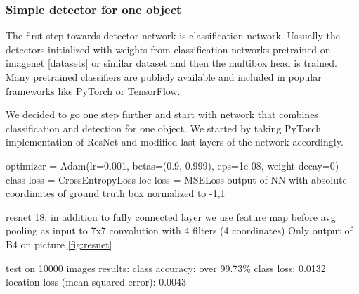 


\subsubsection{Simple detector for one object}
The first step towards detector network is classification network. Ussually the detectors initialized with weights from classification networks pretrained on imagenet \cref{datasets} or similar dataset and then the multibox head is trained. Many pretrained classifiers are publicly available and included in popular frameworks like PyTorch or TensorFlow.

We decided  to go one step further and start with network that combines classification and detection for one object. We started by taking PyTorch implementation of ResNet and modified last layers of the network accordingly. 


optimizer = Adam(lr=0.001, betas=(0.9, 0.999), eps=1e-08, weight decay=0)
class loss = CrossEntropyLoss
loc loss = MSELoss output of NN with absolute coordinates of ground truth box normalized to -1,1 

resnet 18: in addition to fully connected layer we use feature map before avg pooling as input to 7x7 convolution with 4 filters (4 coordinates) Only output of B4 on picture \cref{fig:resnet} 

test on 10000 images
results: class accuracy: over 99.73\%
class loss: 0.0132
location loss (mean squared error): 0.0043



